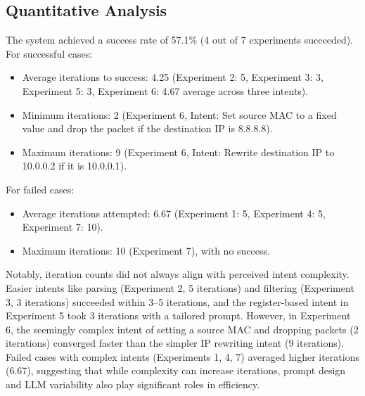 \documentclass[sigconf]{acmart}
\begin{document}
\subsection*{Quantitative Analysis}
The system achieved a success rate of 57.1\% (4 out of 7 experiments succeeded). For successful cases:
\begin{itemize}
    \item Average iterations to success: 4.25 (Experiment 2: 5, Experiment 3: 3, Experiment 5: 3, Experiment 6: 4.67 average across three intents).
    \item Minimum iterations: 2 (Experiment 6, Intent: Set source MAC to a fixed value and drop the packet if the destination IP is 8.8.8.8).
    \item Maximum iterations: 9 (Experiment 6, Intent: Rewrite destination IP to 10.0.0.2 if it is 10.0.0.1).
\end{itemize}
For failed cases:
\begin{itemize}
    \item Average iterations attempted: 6.67 (Experiment 1: 5, Experiment 4: 5, Experiment 7: 10).
    \item Maximum iterations: 10 (Experiment 7), with no success.
\end{itemize}

Notably, iteration counts did not always align with perceived intent complexity. Easier intents like parsing (Experiment 2, 5 iterations) and filtering (Experiment 3, 3 iterations) succeeded within 3–5 iterations, and the register-based intent in Experiment 5 took 3 iterations with a tailored prompt. However, in Experiment 6, the seemingly complex intent of setting a source MAC and dropping packets (2 iterations) converged faster than the simpler IP rewriting intent (9 iterations). Failed cases with complex intents (Experiments 1, 4, 7) averaged higher iterations (6.67), suggesting that while complexity can increase iterations, prompt design and LLM variability also play significant roles in efficiency.
\end{document}
